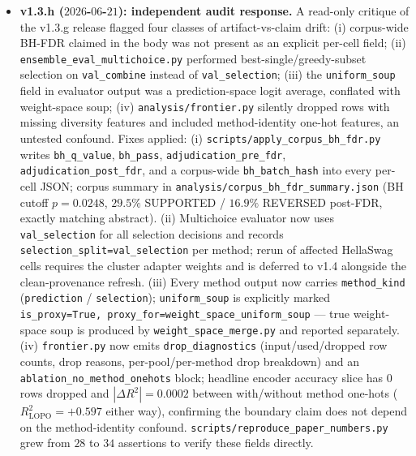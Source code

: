 \documentclass[11pt]{article}
\begin{document}
\begin{itemize}[leftmargin=*]
\item \textbf{v1.3.h ($2026$-$06$-$21$): independent audit response.} A read-only critique of the v1.3.g release flagged four classes of artifact-vs-claim drift: (i) corpus-wide BH-FDR claimed in the body was not present as an explicit per-cell field; (ii) \texttt{ensemble\_\allowbreak eval\_\allowbreak multichoice.\allowbreak py} performed best-single/greedy-subset selection on \texttt{val\_combine} instead of \texttt{val\_selection}; (iii) the \texttt{uniform\_soup} field in evaluator output was a prediction-space logit average, conflated with weight-space soup; (iv) \texttt{analysis/\allowbreak frontier.\allowbreak py} silently dropped rows with missing diversity features and included method-identity one-hot features, an untested confound. Fixes applied: (i) \texttt{scripts/\allowbreak apply\_\allowbreak corpus\_\allowbreak bh\_\allowbreak fdr.\allowbreak py} writes \texttt{bh\_q\_value}, \texttt{bh\_pass}, \texttt{adjudication\_\allowbreak pre\_\allowbreak fdr}, \texttt{adjudication\_\allowbreak post\_\allowbreak fdr}, and a corpus-wide \texttt{bh\_batch\_hash} into every per-cell JSON; corpus summary in \texttt{analysis/\allowbreak corpus\_\allowbreak bh\_\allowbreak fdr\_\allowbreak summary.\allowbreak json} (BH cutoff $p{=}0.0248$, $29.5\%$ SUPPORTED / $16.9\%$ REVERSED post-FDR, exactly matching abstract). (ii) Multichoice evaluator now uses \texttt{val\_selection} for all selection decisions and records \texttt{selection\_\allowbreak split=val\_\allowbreak selection} per method; rerun of affected HellaSwag cells requires the cluster adapter weights and is deferred to v1.4 alongside the clean-provenance refresh. (iii) Every method output now carries \texttt{method\_kind} (\texttt{prediction} / \texttt{selection}); \texttt{uniform\_soup} is explicitly marked \texttt{is\_proxy{=}True,\allowbreak\ proxy\_for{=}\allowbreak weight\_\allowbreak space\_\allowbreak uniform\_\allowbreak soup} — true weight-space soup is produced by \texttt{weight\_\allowbreak space\_\allowbreak merge.\allowbreak py} and reported separately. (iv) \texttt{frontier.py} now emits \texttt{drop\_\allowbreak diagnostics} (input/used/dropped row counts, drop reasons, per-pool/per-method drop breakdown) and an \texttt{ablation\_\allowbreak no\_\allowbreak method\_\allowbreak onehots} block; headline encoder accuracy slice has $0$ rows dropped and $|\Delta R^2|{=}0.0002$ between with/without method one-hots ($R^2_{\text{LOPO}}{=}{+}0.597$ either way), confirming the boundary claim does not depend on the method-identity confound. \texttt{scripts/\allowbreak reproduce\_\allowbreak paper\_\allowbreak numbers.\allowbreak py} grew from $28$ to $34$ assertions to verify these fields directly.

\end{itemize}
\end{document}

